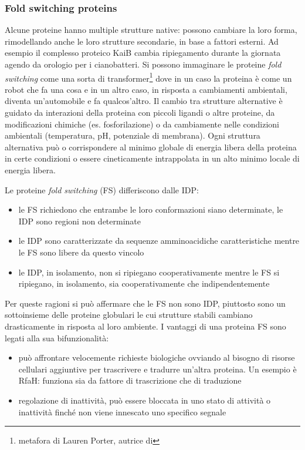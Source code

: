 {\subsubsection{Fold switching proteins} \label{sec:fold-switching-proteins}
{
Alcune proteine hanno multiple strutture native: possono cambiare la loro forma, rimodellando anche le loro strutture secondarie, in base a fattori esterni. Ad esempio il complesso proteico KaiB cambia ripiegamento durante la giornata agendo da orologio per i cianobatteri. Si possono immaginare le proteine \textit{fold switching} come una sorta di transformer\footnote{metafora di Lauren Porter\supercite{porterYT}, autrice di\supercite{porter2018extant}} dove in un caso la proteina è come un robot che fa una cosa e in un altro caso, in risposta a cambiamenti ambientali, diventa un'automobile e fa qualcos'altro. Il cambio tra strutture alternative è guidato da interazioni della proteina con piccoli ligandi o altre proteine, da modificazioni chimiche (es. fosforilazione) o da cambiamente nelle condizioni ambientali (temperatura, pH, potenziale di membrana). Ogni struttura alternativa può o corrispondere al minimo globale di energia libera della proteina in certe condizioni o essere cineticamente intrappolata in un alto minimo locale di energia libera\supercite{varela2019kinetic}.

\par Le proteine \textit{fold switching} (FS) differiscono dalle IDP\supercite{porter2018extant}: 

\begin{itemize}
	\item le FS richiedono che entrambe le loro conformazioni siano determinate, le IDP sono regioni non determinate
	\item le IDP sono caratterizzate da sequenze amminoacidiche caratteristiche mentre le FS sono libere da questo vincolo
	\item le IDP, in isolamento, non si ripiegano cooperativamente mentre le FS si ripiegano, in isolamento, sia cooperativamente che indipendentemente
\end{itemize}

Per queste ragioni si può affermare che le FS non sono IDP, piuttosto sono un sottoinsieme delle proteine globulari le cui strutture stabili cambiano drasticamente in risposta al loro ambiente. I vantaggi di una proteina FS sono legati alla sua bifunzionalità:
\begin{itemize}
	\item può affrontare velocemente richieste biologiche ovviando al bisogno di risorse cellulari aggiuntive per trascrivere e tradurre un'altra proteina. Un esempio è RfaH: funziona sia da fattore di trascrizione che di traduzione
	\item regolazione di inattività, può essere bloccata in uno stato di attività o inattività finché non viene innescato uno specifico segnale
\end{itemize}

}}
